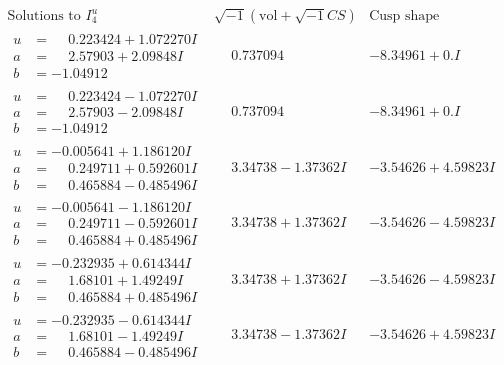 \documentclass[1p]{elsarticle_modified}
\theoremstyle{definition}
\newcommand{\I}{\sqrt{-1}}
\begin{document}
$$\begin{array}{c|c|c}  
\text{Solutions to }I^u_{4}& \I (\text{vol} + \sqrt{-1}CS) & \text{Cusp shape}\\
 \hline 
\begin{aligned}
u &= \phantom{-}0.223424 + 1.072270 I \\
a &= \phantom{-}2.57903 + 2.09848 I \\
b &= -1.04912\phantom{ +0.000000I}\end{aligned}
 & \phantom{-}0.737094\phantom{ +0.000000I} & -8.34961 + 0. I\phantom{ +0.000000I} \\ \hline\begin{aligned}
u &= \phantom{-}0.223424 - 1.072270 I \\
a &= \phantom{-}2.57903 - 2.09848 I \\
b &= -1.04912\phantom{ +0.000000I}\end{aligned}
 & \phantom{-}0.737094\phantom{ +0.000000I} & -8.34961 + 0. I\phantom{ +0.000000I} \\ \hline\begin{aligned}
u &= -0.005641 + 1.186120 I \\
a &= \phantom{-}0.249711 + 0.592601 I \\
b &= \phantom{-}0.465884 - 0.485496 I\end{aligned}
 & \phantom{-}3.34738 - 1.37362 I & -3.54626 + 4.59823 I \\ \hline\begin{aligned}
u &= -0.005641 - 1.186120 I \\
a &= \phantom{-}0.249711 - 0.592601 I \\
b &= \phantom{-}0.465884 + 0.485496 I\end{aligned}
 & \phantom{-}3.34738 + 1.37362 I & -3.54626 - 4.59823 I \\ \hline\begin{aligned}
u &= -0.232935 + 0.614344 I \\
a &= \phantom{-}1.68101 + 1.49249 I \\
b &= \phantom{-}0.465884 + 0.485496 I\end{aligned}
 & \phantom{-}3.34738 + 1.37362 I & -3.54626 - 4.59823 I \\ \hline\begin{aligned}
u &= -0.232935 - 0.614344 I \\
a &= \phantom{-}1.68101 - 1.49249 I \\
b &= \phantom{-}0.465884 - 0.485496 I\end{aligned}
 & \phantom{-}3.34738 - 1.37362 I & -3.54626 + 4.59823 I \\ \hline\begin{aligned}

\end{aligned}
\end{array}$$
\end{document}

